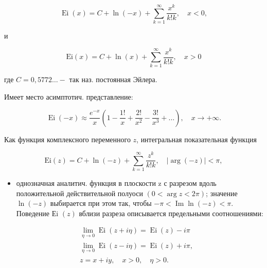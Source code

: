 \documentclass[10pt]{article}
\begin{document}
\[

\operatorname{Ei}(x)=C+\ln (-x)+\sum_{k=1}^{\infty} \frac{x^{k}}{k ! k}, \quad x<0,

\]



и



\[

\mathrm{Ei}(x)=C+\ln (x)+\sum_{k=1}^{\infty} \frac{x^{k}}{k ! k}, \quad x>0

\]



где $C=0,5772 \ldots-$ так наз. постоянная Эйлера.



Имеет место асимптотич. представление:



\[

\operatorname{Ei}(-x) \approx \frac{e^{-x}}{x}\left(1-\frac{1 !}{x}+\frac{2 !}{x^{2}}-\frac{3 !}{x^{3}}+\ldots\right), \quad x \rightarrow+\infty .

\]



Как функция комплексного переменного $z$, интегральная показательная функция



\[

\mathrm{Ei}(z)=C+\ln (-z)+\sum_{k=1}^{\infty} \frac{z^{k}}{k ! k}, \quad|\arg (-z)|<\pi,

\]



\begin{itemize}

  \item однозначная аналитич. функция в плоскости z с разрезом вдоль положительной действительной полуоси $(0<\arg z<2 \pi)$; значение $\ln (-z)$ выбирается при этом так, чтобы $-\pi<\operatorname{Im} \ln (-z)<\pi$. Поведение Еi $(z)$ вблизи разреза описывается предельными соотношениями:

\end{itemize}



\[

\begin{aligned}

& \lim _{\eta \rightarrow 0} \operatorname{Ei}(z+i \eta)=\operatorname{Ei}(z)-i \pi \\

& \lim _{\eta \rightarrow 0} \operatorname{Ei}(z-i \eta)=\operatorname{Ei}(z)+i \pi, \\

& z=x+i y, \quad x>0, \quad \eta>0 .

\end{aligned}

\]
\end{document}
